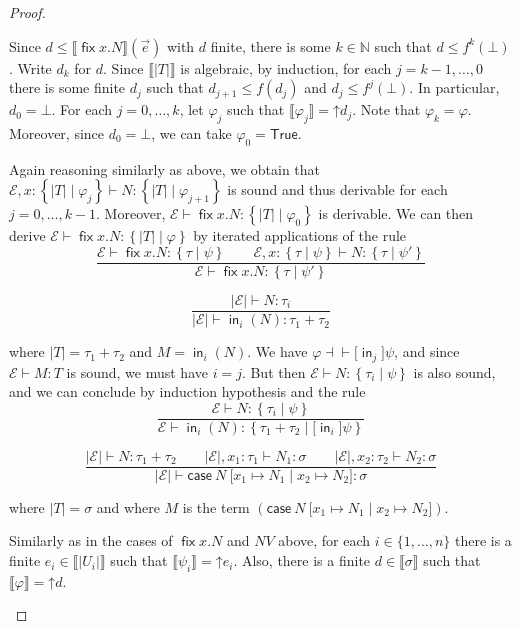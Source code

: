 \documentclass[%
  a4paper,
  UKenglish,
  cleveref,
  autoref,
  thm-restate,
  numberwithinsect,
]{lipics-v2021}
\newcommand\thesis{\vdash}
\newcommand\defthesisiff{\dashv\vdash}
\newcommand\thesisiff{\mathrel{\defthesisiff}}
\newcommand\copair[1]{{\lbrack #1 \rbrack}}
\newcommand\up{\mathord{\uparrow}}
\newcommand\NN{\mathbb{N}}
\newcommand\I[1]{\llbracket #1 \rrbracket} %
\newcommand\temp[1]{\mathsf{#1}}
\newcommand\True{\temp{True}}
\newcommand\Env{\mathcal{E}}    %
\newcommand\term[1]{\mathsf{#1}}
\newcommand\cse{\term{case}}
\newcommand\inj{\mathop{\term{in}}}
\newcommand\fix{\mathop{\term{fix}}}
\newcommand\reft[1]{\left\{ #1 \right\}}
\newcommand\PT{\tau}		%
\newcommand\PTbis{\sigma}	%
\newcommand\RT{T}               %
\newcommand\RTbis{U}            %
\newcommand\UPT[1]{\vert #1 \vert}        %
\newcommand\form[1]{\lbrack #1 \rbrack}
\begin{document}
\begin{proof}
\begin{description}
Since $d \leq \I{\fix x.N}(\vec e)$ with $d$ finite,
there is some $k \in \NN$
such that
$d \leq f^k(\bot)$.
Write $d_k$ for $d$.
Since $\I{\UPT\RT}$ is algebraic,
by induction, for each $j = k-1,\dots,0$
there is some finite $d_j$ such that 
$d_{j+1} \leq f(d_j)$
and
$d_j \leq f^{j}(\bot)$.
In particular, $d_0 = \bot$.
For each $j = 0,\dots,k$,
let $\varphi_j$ such that $\I{\varphi_j} = \up d_j$.
Note that $\varphi_k = \varphi$.
Moreover, since $d_0 = \bot$,
we can take $\varphi_0 = \True$.

Again reasoning similarly as above,
we obtain that 
\(
  \Env, x \colon \reft{\UPT\RT \mid \varphi_j} \thesis
  N \colon \reft{\UPT\RT \mid \varphi_{j+1}}
\)
is sound and thus derivable for each $j = 0,\dots,k-1$.
Moreover,
$\Env \thesis \fix x.N \colon \reft{\UPT\RT \mid \varphi_0}$
is derivable.
We can then derive $\Env \thesis \fix x.N \colon \reft{\UPT\RT \mid \varphi}$
by iterated applications of the rule
\[
\dfrac{\Env \thesis \fix x.N \colon \reft{\PT \mid \psi}
  \qquad
  \Env, x: \reft{\PT \mid \psi} \thesis N \colon \reft{\PT \mid \psi'}}
  {\Env \thesis \fix x.N \colon \reft{\PT \mid \psi'}}
\]


\item[Case of]
\[
\dfrac{\UPT\Env \thesis N \colon \PT_i}
  {\UPT\Env \thesis \inj_i(N) \colon \PT_1 + \PT_2}
\]

\noindent
where $\UPT\RT = \PT_1 + \PT_2$ and $M = \inj_i(N)$.
We have $\varphi \thesisiff \form{\inj_j}\psi$,
and since $\Env \thesis M\colon \RT$ is sound,
we must have $i = j$.
But then $\Env \thesis N \colon \reft{\PT_i \mid \psi}$
is also sound, and we can conclude by induction hypothesis and
the rule
\[
\dfrac{\Env \thesis N \colon \reft{\PT_i \mid \psi}}
  {\Env \thesis \inj_i(N) \colon \reft{\PT_1 + \PT_2 \mid \form{\inj_i} \psi}}
\]

\item[Case of]
\[
\dfrac{\UPT\Env \thesis N \colon \PT_1 + \PT_2
  \qquad \UPT\Env, x_1 \colon \PT_1 \thesis N_1 \colon \PTbis
  \qquad \UPT\Env, x_2 \colon \PT_2 \thesis N_2 \colon \PTbis}
  {\UPT\Env \thesis \cse\ N\ \copair{x_1 \mapsto N_1 \mid x_2 \mapsto N_2} \colon \PTbis}
\]

\noindent
where $\UPT\RT = \PTbis$
and where $M$ is the term
$(\cse\ N\ \copair{x_1 \mapsto N_1 \mid x_2 \mapsto N_2})$.

Similarly as in the cases of $\fix x.N$ and $N V$ above,
for each $i \in \{1,\dots,n\}$
there is a finite $e_i \in \I{\UPT{\RTbis_i}}$
such that $\I{\psi_i} = \up e_i$.
Also, there is a finite $d \in \I\PTbis$ such that $\I\varphi = \up d$.


\end{description}
\end{proof}
\end{document}
